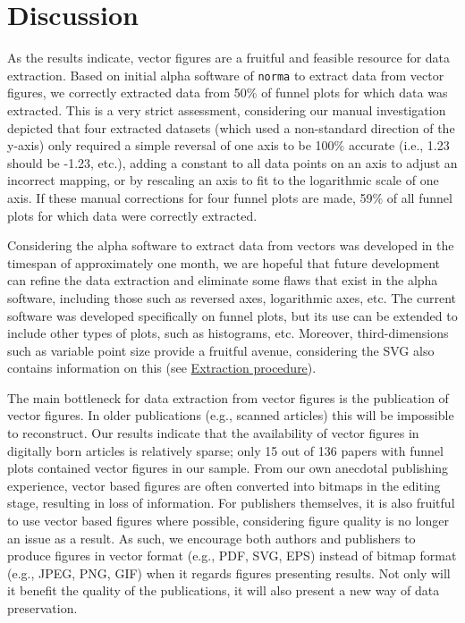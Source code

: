 \documentclass[a5paper]{book}
\begin{document}
\section{Discussion}\label{discussion-6}

As the results indicate, vector figures are a fruitful and feasible
resource for data extraction. Based on initial alpha software of
\texttt{norma} to extract data from vector figures, we correctly
extracted data from 50\% of funnel plots for which data was extracted.
This is a very strict assessment, considering our manual investigation
depicted that four extracted datasets (which used a non-standard
direction of the y-axis) only required a simple reversal of one axis to
be 100\% accurate (i.e., 1.23 should be -1.23, etc.), adding a constant
to all data points on an axis to adjust an incorrect mapping, or by
rescaling an axis to fit to the logarithmic scale of one axis. If these
manual corrections for four funnel plots are made, 59\% of all funnel
plots for which data were correctly extracted.

Considering the alpha software to extract data from vectors was
developed in the timespan of approximately one month, we are hopeful
that future development can refine the data extraction and eliminate
some flaws that exist in the alpha software, including those such as
reversed axes, logarithmic axes, etc. The current software was developed
specifically on funnel plots, but its use can be extended to include
other types of plots, such as histograms, etc. Moreover,
third-dimensions such as variable point size provide a fruitful avenue,
considering the SVG also contains information on this (see
\protect\hyperlink{extraction-procedure}{Extraction procedure}).

The main bottleneck for data extraction from vector figures is the
publication of vector figures. In older publications (e.g., scanned
articles) this will be impossible to reconstruct. Our results indicate
that the availability of vector figures in digitally born articles is
relatively sparse; only 15 out of 136 papers with funnel plots contained
vector figures in our sample. From our own anecdotal publishing
experience, vector based figures are often converted into bitmaps in the
editing stage, resulting in loss of information. For publishers
themselves, it is also fruitful to use vector based figures where
possible, considering figure quality is no longer an issue as a result.
As such, we encourage both authors and publishers to produce figures in
vector format (e.g., PDF, SVG, EPS) instead of bitmap format (e.g.,
JPEG, PNG, GIF) when it regards figures presenting results. Not only
will it benefit the quality of the publications, it will also present a
new way of data preservation.
\end{document}
